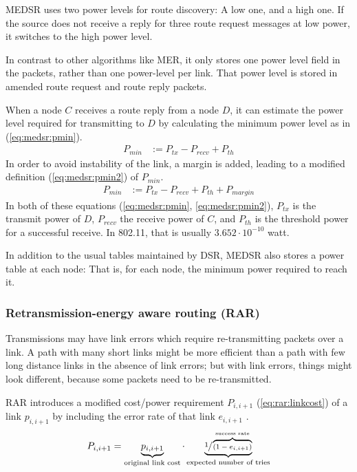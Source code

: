 MEDSR uses two power levels for route discovery: A low one, and a high one. If
the source does not receive a reply for three route request messages at low
power, it switches to the high power level.

In contrast to other algorithms like MER, it only stores one power level field
in the packets, rather than one power-level per link. That power level is stored
in amended route request and route reply packets.

When a node $C$ receives a route reply from a node $D$, it can estimate the
power level required for transmitting to $D$ by calculating the minimum power
level as in (\ref{eq:medsr:pmin}).
\begin{align}
  \label{eq:medsr:pmin}
   P_{min} &:= P_{tx} - P_{recv} + P_{th} 
\end{align}
In order to avoid instability of the link, a margin is added,
leading to a modified definition (\ref{eq:medsr:pmin2}) of $P_{min}$.
\begin{align}
  \label{eq:medsr:pmin2}
   P_{min} &:= P_{tx} - P_{recv} + P_{th} + P_{margin}
\end{align}
In both of these equations (\ref{eq:medsr:pmin}, \ref{eq:medsr:pmin2}), $P_{tx}$ is the transmit power of $D$, $P_{recv}$ the receive power of $C$,
and $P_{th}$ is the threshold power for a successful receive. In 802.11, that is
usually $3.652 \cdot 10^{-10}$ watt.

In addition to the usual tables maintained by DSR, MEDSR also stores a power
table at each node: That is, for each node, the minimum power required to reach it.



\subsubsection{Retransmission-energy aware routing (RAR)}
Transmissions may have link errors which require re-transmitting packets over
a link. A path with many short links might be more efficient than a path with
few long distance links in the absence of link errors; but with link errors,
things might look different, because some packets need to be re-transmitted.

RAR\cite{banerjee2002minimum} introduces a modified cost/power requirement
$P_{i,i+1}$ (\ref{eq:rar:linkcost}) of a link $p_{i,i+1}$ by including the error
rate of that link $e_{i,i+1}$ .
\begin{align}\label{eq:rar:linkcost}
  P_{i,i+1} = \underbrace{p_{i,i+1}}_{\text{original link cost}} \cdot \underbrace{\sfrac{1}{\overbrace{(1-e_{i,i+1})}^{\text{success rate}}}}_{\text{expected number of tries}}
\end{align} 

